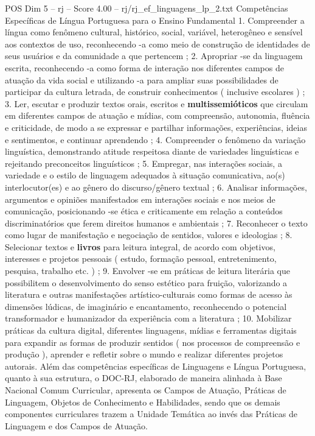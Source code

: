 \begin{textsample}{POS Dim 5 – rj – Score 4.00 – rj/rj\_ef\_linguagens\_lp\_2.txt}
Competências Específicas de Língua Portuguesa para o Ensino Fundamental 1.
Compreender a língua como fenômeno cultural, histórico, social, variável, heterogêneo e sensível aos contextos de uso, reconhecendo -a como meio de construção de identidades de seus usuários e da comunidade a que pertencem ; 2.
Apropriar -se da linguagem escrita, reconhecendo -a como forma de interação nos diferentes campos de atuação da vida social e utilizando -a para ampliar suas possibilidades de participar da cultura letrada, de construir conhecimentos ( inclusive escolares ) ; 3.
Ler, escutar e produzir textos orais, escritos e \textbf{multissemióticos} que circulam em diferentes campos de atuação e mídias, com compreensão, autonomia, fluência e criticidade, de modo a se expressar e partilhar informações, experiências, ideias e sentimentos, e continuar aprendendo ; 4.
Compreender o fenômeno da variação linguística, demonstrando atitude respeitosa diante de variedades linguísticas e rejeitando preconceitos linguísticos ; 5.
Empregar, nas interações sociais, a variedade e o estilo de linguagem adequados à situação comunicativa, ao(s) interlocutor(es) e ao gênero do discurso/gênero textual ; 6.
Analisar informações, argumentos e opiniões manifestados em interações sociais e nos meios de comunicação, posicionando -se ética e criticamente em relação a conteúdos discriminatórios que ferem direitos humanos e ambientais ; 7.
Reconhecer o texto como lugar de manifestação e negociação de sentidos, valores e ideologias ; 8.
Selecionar textos e \textbf{livros} para leitura integral, de acordo com objetivos, interesses e projetos pessoais ( estudo, formação pessoal, entretenimento, pesquisa, trabalho etc. ) ; 9.
Envolver -se em práticas de leitura literária que possibilitem o desenvolvimento do senso estético para fruição, valorizando a literatura e outras manifestações artístico-culturais como formas de acesso às dimensões lúdicas, de imaginário e encantamento, reconhecendo o potencial transformador e humanizador da experiência com a literatura ; 10.
Mobilizar práticas da cultura digital, diferentes linguagens, mídias e ferramentas digitais para expandir as formas de produzir sentidos ( nos processos de compreensão e produção ), aprender e refletir sobre o mundo e realizar diferentes projetos autorais.
Além das competências específicas de Linguagens e Língua Portuguesa, quanto à sua estrutura, o DOC-RJ, elaborado de maneira alinhada à Base Nacional Comum Curricular, apresenta os Campos de Atuação, Práticas de Linguagem, Objetos de Conhecimento e Habilidades, sendo que os demais componentes curriculares trazem a Unidade Temática ao invés das Práticas de Linguagem e dos Campos de Atuação.

\end{textsample}
